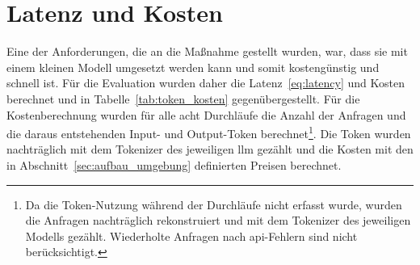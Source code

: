 \section{Latenz und Kosten}\label{sec:latenz_kosten}

Eine der Anforderungen, die an die Maßnahme gestellt wurden, war, dass sie mit einem kleinen Modell umgesetzt werden kann und somit kostengünstig und schnell ist. Für die 
Evaluation wurden daher die Latenz~\eqref{eq:latency} und Kosten berechnet und in Tabelle~\ref{tab:token_kosten} gegenübergestellt. Für die Kostenberechnung wurden
für alle
acht Durchläufe die Anzahl der Anfragen und die daraus entstehenden Input- und Output-Token berechnet\footnote{Da die Token-Nutzung während der Durchläufe nicht erfasst wurde, wurden die Anfragen nachträglich rekonstruiert und mit dem Tokenizer des jeweiligen Modells gezählt. Wiederholte Anfragen nach \acs{api}-Fehlern sind nicht berücksichtigt.}. 
Die Token wurden 
nachträglich mit dem Tokenizer des jeweiligen \ac{llm} gezählt und die Kosten mit den in Abschnitt~\ref{sec:aufbau_umgebung} definierten Preisen berechnet.

\begin{table}[htbp]
\centering
\caption{Anfragen, Token, Kosten und Latenz der Durchläufe}
\label{tab:token_kosten}

\end{table}

